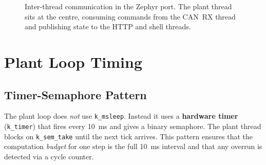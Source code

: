 \documentclass[11pt,a4paper]{article}
\begin{document}
\begin{figure}[H]
\caption{Inter-thread communication in the Zephyr port. The plant thread sits
at the centre, consuming commands from the CAN~RX thread and publishing state
to the HTTP and shell threads.}
\label{fig:thread_arch}
\end{figure}

\section{Plant Loop Timing}

\subsection{Timer-Semaphore Pattern}

The plant loop does \emph{not} use \texttt{k\_msleep}. Instead it uses a
\textbf{hardware timer} (\texttt{k\_timer}) that fires every \SI{10}{ms} and
gives a binary semaphore. The plant thread blocks on \texttt{k\_sem\_take}
until the next tick arrives. This pattern ensures that the computation
\emph{budget} for one step is the full \SI{10}{ms} interval and that any
overrun is detected via a cycle counter.
\end{document}
